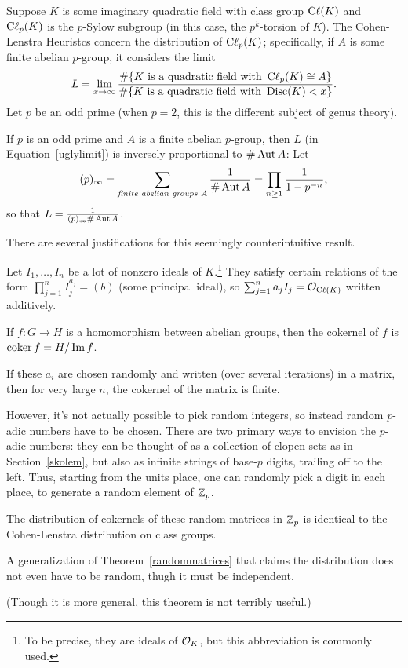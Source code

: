 Suppose $K$ is some imaginary quadratic field with class group $\operatorname{C\ell}(K)$ and $\operatorname{C\ell}_p(K)$ is the $p$-Sylow subgroup (in this case, the $p^k$-torsion of $K$). The Cohen-Lenstra Heuristcs concern the distribution of $\operatorname{C\ell}_p(K)$; specifically, if $A$ is some finite abelian $p$-group, it considers the limit
\begin{equation}
L = \lim_{x\to\infty} \frac{\#\{\text{$K$ is a quadratic field with } \operatorname{C\ell}_p(K) \cong A\}}{\#\{\text{$K$ is a quadratic field with } \operatorname{Disc}(K) < x\}}.
\label{uglylimit}
\end{equation}
Let $p$ be an odd prime (when $p = 2$, this is the different subject of genus theory).
\begin{thm}
If $p$ is an odd prime and $A$ is a finite abelian $p$-group, then $L$ (in Equation~\ref{uglylimit}) is inversely proportional to $\#\operatorname{Aut} A$: Let
\[(p)_\infty = \sum_{\text{\emph{finite abelian groups }}A} \frac{1}{\#\operatorname{Aut} A} = \prod_{n\ge 1} \frac{1}{1-p^{-n}},\]
so that $L = \frac{1}{(p)_\infty\#\operatorname{Aut} A}$.
\end{thm}
There are several justifications for this seemingly counterintuitive result.

Let $I_1,\dots,I_n$ be a lot of nonzero ideals of $K$.\footnote{To be precise, they are ideals of $\mathcal{O}_K$, but this abbreviation is commonly used.} They satisfy certain relations of the form $\prod_{j=1}^n I_j^{a_j} = (b)$ (some principal ideal), so $\sum_{j=1}^n a_jI_j = \mathcal{O}_{\operatorname{C\ell}(K)}$ written additively.
\begin{defn}
If $f:G\to H$ is a homomorphism between abelian groups, then the cokernel of $f$ is $\operatorname{coker} f = H/\operatorname{Im} f$.
\end{defn}
If these $a_i$ are chosen randomly and written (over several iterations) in a matrix, then for very large $n$, the cokernel of the matrix is finite.

However, it's not actually possible to pick random integers, so instead random $p$-adic numbers have to be chosen. There are two primary ways to envision the $p$-adic numbers: they can be thought of as a collection of clopen sets as in Section~\ref{skolem}, but also as infinite strings of base-$p$ digits, trailing off to the left. Thus, starting from the units place, one can randomly pick a digit in each place, to generate a random element of $\mathbb{Z}_p$.
\begin{thm}
\label{randommatrices}
The distribution of cokernels of these random matrices in $\mathbb{Z}_p$ is identical to the Cohen-Lenstra distribution on class groups.
\end{thm}
\begin{thm}[Maples]
A generalization of Theorem~\ref{randommatrices} that claims the distribution does not even have to be random, thugh it must be independent.
\end{thm}
(Though it is more general, this theorem is not terribly useful.)

